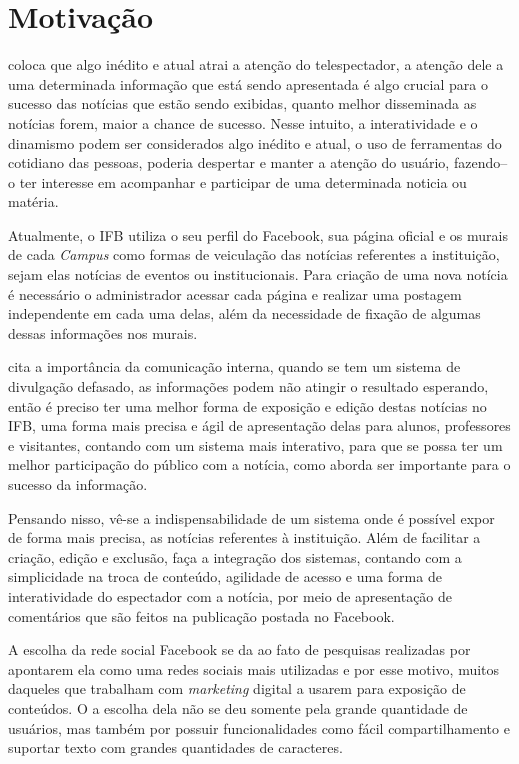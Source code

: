 \section{Motivação}
\citet{bianchi2006} coloca que algo inédito e atual atrai a atenção do telespectador, a atenção dele a uma determinada informação que está sendo apresentada é algo crucial para o sucesso das notícias que estão sendo exibidas, quanto melhor disseminada as notícias forem, maior a chance de sucesso. Nesse intuito, a interatividade e o dinamismo podem ser considerados algo inédito e atual, o uso de ferramentas do cotidiano das pessoas, poderia despertar e manter a atenção do usuário, fazendo--o ter interesse em acompanhar e participar de uma determinada noticia ou matéria.

Atualmente, o IFB utiliza o seu perfil do Facebook, sua página oficial e os murais de cada \textit{Campus} como formas de veiculação das notícias referentes a instituição, sejam elas notícias de eventos ou institucionais. Para criação de uma nova notícia é necessário o administrador acessar cada página e realizar uma postagem independente em cada uma delas, além da necessidade de fixação de algumas dessas informações nos murais. 

\citet{pinheiro2010} cita a importância da comunicação interna, quando se tem um sistema de divulgação defasado, as informações podem não atingir o resultado esperando, então é preciso ter uma melhor forma de exposição e edição destas notícias no IFB, uma forma mais precisa e ágil de apresentação delas para alunos, professores e visitantes, contando com um sistema mais interativo, para que se possa ter um melhor participação do público com a notícia, como \citet{santos2014} aborda ser importante para o sucesso da informação.

Pensando nisso, vê-se a indispensabilidade de um sistema onde é possível expor de forma mais precisa, as notícias referentes à instituição. Além de facilitar a criação, edição e exclusão, faça a integração dos sistemas, contando com a simplicidade na troca de conteúdo, agilidade de acesso e uma forma de interatividade do espectador com a notícia, por meio de apresentação de comentários que são feitos na publicação postada no Facebook.

A escolha da rede social Facebook se da ao fato de pesquisas realizadas por \citet{muchardie2016} apontarem ela como uma redes sociais mais utilizadas e por esse motivo, muitos daqueles que trabalham com \textit{marketing} digital a usarem para exposição de conteúdos. O a escolha dela não se deu somente pela grande quantidade de usuários, mas também por possuir funcionalidades como fácil compartilhamento e suportar texto com grandes quantidades de caracteres.

